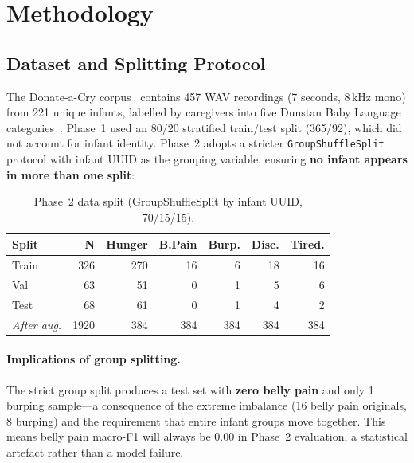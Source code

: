 \documentclass[11pt,a4paper]{article}
\begin{document}
\section{Methodology}
\label{sec:methods}

\subsection{Dataset and Splitting Protocol}
\label{sec:dataset}

The Donate-a-Cry corpus~\cite{donateacry} contains 457 WAV recordings
(7 seconds, 8\,kHz mono) from 221 unique infants, labelled by caregivers
into five Dunstan Baby Language categories~\cite{dunstan2006}. Phase~1
used an 80/20 stratified train/test split (365/92), which did not
account for infant identity. Phase~2 adopts a stricter
\texttt{GroupShuffleSplit} protocol with infant UUID as the grouping
variable, ensuring \textbf{no infant appears in more than one split}:

\begin{table}[H]
\centering
\caption{Phase~2 data split (GroupShuffleSplit by infant UUID, 70/15/15).}
\label{tab:split}
\begin{tabular}{lrrrrrr}
\toprule
\textbf{Split} & \textbf{N} & \textbf{Hunger} & \textbf{B.Pain} & \textbf{Burp.} & \textbf{Disc.} & \textbf{Tired.} \\
\midrule
Train & 326 & 270 & 16 &  6 & 18 & 16 \\
Val   &  63 &  51 &  0 &  1 &  5 &  6 \\
Test  &  68 &  61 &  0 &  1 &  4 &  2 \\
\midrule
\textit{After aug.} & 1920 & 384 & 384 & 384 & 384 & 384 \\
\bottomrule
\end{tabular}
\end{table}

\paragraph{Implications of group splitting.}
The strict group split produces a test set with \textbf{zero belly pain}
and only 1 burping sample---a consequence of the extreme imbalance (16
belly pain originals, 8 burping) and the requirement that entire
infant groups move together. This means belly pain macro-F1 will always
be 0.00 in Phase~2 evaluation, a statistical artefact rather than a
model failure.
\end{document}
